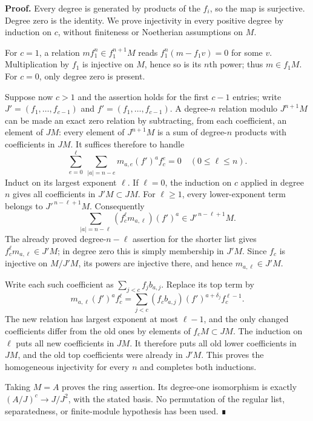 \documentclass[11pt,a4paper,openany]{report}
\begin{document}
\textbf{Proof.} Every degree is generated by products of the \(f_i\), so the map is surjective. Degree zero is the identity. We prove injectivity in every positive degree by induction on \(c\), without finiteness or Noetherian assumptions on \(M\).

For \(c=1\), a relation \(mf_1^n\in f_1^{n+1}M\) reads \(f_1^n(m-f_1v)=0\) for some \(v\). Multiplication by \(f_1\) is injective on \(M\), hence so is its \(n\)th power; thus \(m\in f_1M\). For \(c=0\), only degree zero is present.

Suppose now \(c>1\) and the assertion holds for the first \(c-1\) entries; write \(J'=(f_1,\ldots,f_{c-1})\) and \(f'= (f_1,\ldots,f_{c-1})\). A degree-\(n\) relation modulo \(J^{n+1}M\) can be made an exact zero relation by subtracting, from each coefficient, an element of \(JM\): every element of \(J^{n+1}M\) is a sum of degree-\(n\) products with coefficients in \(JM\). It suffices therefore to handle \[\sum_{e=0}^{\ell}\ \sum_{|a|=n-e}m_{a,e}(f')^a f_c^e=0
\quad(0\leq\ell\leq n).\] Induct on its largest exponent \(\ell\). If \(\ell=0\), the induction on \(c\) applied in degree \(n\) gives all coefficients in \(J'M\subset JM\). For \(\ell\geq1\), every lower-exponent term belongs to \(J'^{\,n-\ell+1}M\). Consequently \[\sum_{|a|=n-\ell}(f_c^\ell m_{a,\ell})(f')^a
\in J'^{\,n-\ell+1}M.\] The already proved degree-\(n-\ell\) assertion for the shorter list gives \(f_c^\ell m_{a,\ell}\in J'M\); in degree zero this is simply membership in \(J'M\). Since \(f_c\) is injective on \(M/J'M\), its powers are injective there, and hence \(m_{a,\ell}\in J'M\).

Write each such coefficient as \(\sum_{j<c}f_jb_{a,j}\). Replace its top term by \[m_{a,\ell}(f')^af_c^\ell
=\sum_{j<c}(f_cb_{a,j})(f')^{a+\delta_j}f_c^{\ell-1}.\] The new relation has largest exponent at most \(\ell-1\), and the only changed coefficients differ from the old ones by elements of \(f_cM\subset JM\). The induction on \(\ell\) puts all new coefficients in \(JM\). It therefore puts all old lower coefficients in \(JM\), and the old top coefficients were already in \(J'M\). This proves the homogeneous injectivity for every \(n\) and completes both inductions.

Taking \(M=A\) proves the ring assertion. Its degree-one isomorphism is exactly \((A/J)^c\to J/J^2\), with the stated basis. No permutation of the regular list, separatedness, or finite-module hypothesis has been used. ∎

\label{AG-RG-S05-algebra-lemma-regular-sequence-in-polynomial-ring}
\end{document}
